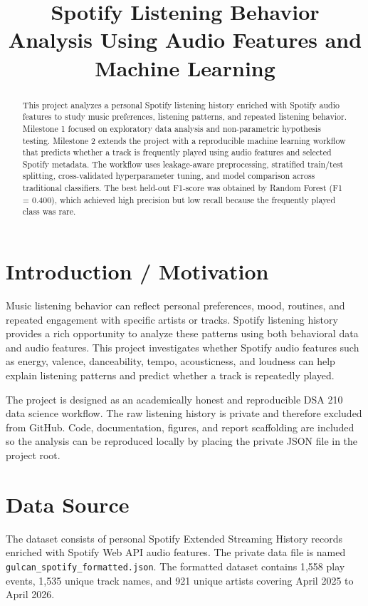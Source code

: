 \documentclass[conference]{IEEEtran}
\title{Spotify Listening Behavior Analysis Using Audio Features and Machine Learning}
\author{
\IEEEauthorblockN{Ayse Gulcan Yoruk}
\IEEEauthorblockA{DSA 210 Introduction to Data Science\\
Spring 2026}
}
\begin{document}
\maketitle

\begin{abstract}
This project analyzes a personal Spotify listening history enriched with Spotify audio features to study music preferences, listening patterns, and repeated listening behavior. Milestone 1 focused on exploratory data analysis and non-parametric hypothesis testing. Milestone 2 extends the project with a reproducible machine learning workflow that predicts whether a track is frequently played using audio features and selected Spotify metadata. The workflow uses leakage-aware preprocessing, stratified train/test splitting, cross-validated hyperparameter tuning, and model comparison across traditional classifiers. The best held-out F1-score was obtained by Random Forest (F1 = 0.400), which achieved high precision but low recall because the frequently played class was rare.
\end{abstract}

\section{Introduction / Motivation}
Music listening behavior can reflect personal preferences, mood, routines, and repeated engagement with specific artists or tracks. Spotify listening history provides a rich opportunity to analyze these patterns using both behavioral data and audio features. This project investigates whether Spotify audio features such as energy, valence, danceability, tempo, acousticness, and loudness can help explain listening patterns and predict whether a track is repeatedly played.

The project is designed as an academically honest and reproducible DSA 210 data science workflow. The raw listening history is private and therefore excluded from GitHub. Code, documentation, figures, and report scaffolding are included so the analysis can be reproduced locally by placing the private JSON file in the project root.

\section{Data Source}
The dataset consists of personal Spotify Extended Streaming History records enriched with Spotify Web API audio features. The private data file is named \texttt{gulcan\_spotify\_formatted.json}. The formatted dataset contains 1,558 play events, 1,535 unique track names, and 921 unique artists covering April 2025 to April 2026.
\end{document}

